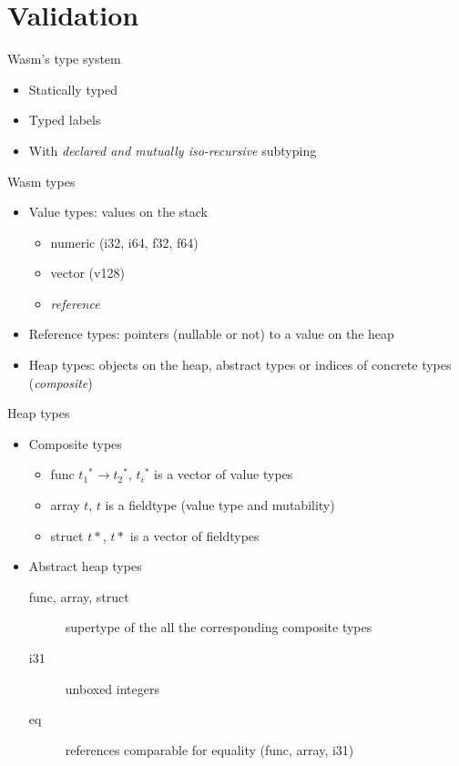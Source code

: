 \documentclass{beamer}
\begin{document}
\section{Validation}
\begin{frame}{Wasm's type system}
  \begin{itemize}
    \item Statically typed
    \item Typed labels
    \item With \emph{declared and mutually iso-recursive} subtyping
  \end{itemize}
\end{frame}
\begin{frame}{Wasm types}
  \begin{itemize}
    \item Value types: values on the stack\pause
      \begin{itemize}
        \item numeric (i32, i64, f32, f64)
        \item vector (v128)
        \item \emph{reference}
      \end{itemize}\pause
    \item Reference types: pointers (nullable or not) to a value on the heap
      \pause
    \item Heap types: objects on the heap, abstract types or indices of concrete
      types (\emph{composite})
  \end{itemize}
\end{frame}
\begin{frame}{Heap types}
  \begin{itemize}
    \item Composite types
      \begin{itemize}
        \item \textsf{func} ${t_1}^*\to {t_2}^*$, ${t_i}^*$ is a
          vector of value types\pause
        \item \textsf{array} $t$, $t$ is a fieldtype (value type and
          mutability)\pause
        \item \textsf{struct} $t*$, $t*$ is a vector of fieldtypes
      \end{itemize}\pause
    \item Abstract heap types
      \begin{description}
        \item[func, array, struct] supertype of the all the corresponding
          composite types
        \item[i31] unboxed integers
        \item[eq] references comparable for equality (func, array, i31)
      \end{description}
  \end{itemize}
\end{frame}
\end{document}
